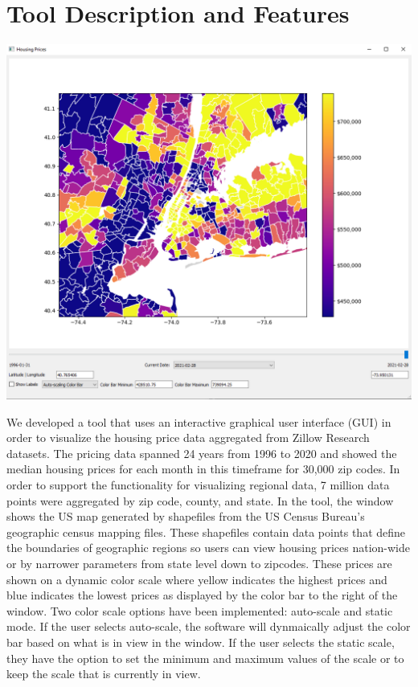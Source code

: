 \documentclass{article}
\begin{document}
\section{Tool Description and Features}
\begin{center}
  \includegraphics[scale=0.5]{software_tool.png} 
\end{center}  

We developed a tool that uses an interactive graphical user interface (GUI) in order to visualize the housing price data aggregated from Zillow Research datasets. The
pricing data spanned 24 years from 1996 to 2020 and showed the median housing prices for each month in this timeframe for 30,000 zip codes. In order to support the
functionality for visualizing regional data, 7 million data points were aggregated by zip code, county, and state. In the tool, the window
shows the US map generated by shapefiles from the US Census Bureau's geographic census mapping files. These shapefiles contain data points that define the
boundaries of geographic regions so users can view housing prices nation-wide or by narrower parameters from state level down to zipcodes. These prices are shown
on a dynamic color scale where yellow indicates the highest prices and blue indicates the lowest prices as displayed by the color bar to the right of the window.
Two color scale options have been implemented: auto-scale and static mode. If the user selects auto-scale, the software will dynmaically adjust the color bar based
on what is in view in the window. If the user selects the static scale, they have the option to set the minimum and maximum values of the scale or to keep the scale that is currently in view. 
\end{document}
